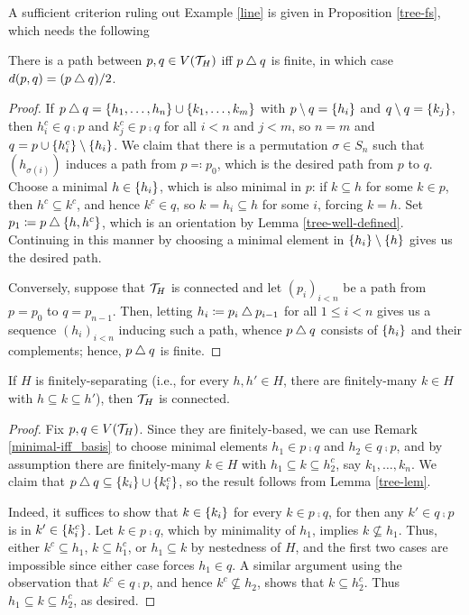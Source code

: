 \documentclass{amsart}
\begin{document}
    A sufficient criterion ruling out Example \ref{line} is given in Proposition \ref{tree-fs}, which needs the following

    \begin{lemma}\label{tree-lem}
        There is a path between $p,q\in V(\mathcal{T}_H)$ iff $p\bigtriangleup q$ is finite, in which case $d(p,q)=(p\bigtriangleup q)/2$.
    \end{lemma}
    \begin{proof}
        If $p\bigtriangleup q=\left\{h_1,\dots,h_n\right\}\cup\left\{k_1,\dots,k_m\right\}$ with $p\setminus q=\left\{h_i\right\}$ and $q\setminus q=\left\{k_j\right\}$, then $h_i^c\in q\comp p$ and $k_j^c\in p\comp q$ for all $i<n$ and $j<m$, so $n=m$ and $q=p\cup\left\{h_i^c\right\}\setminus\left\{h_i\right\}$. We claim that there is a permutation $\sigma\in S_n$ such that $(h_{\sigma(i)})$ induces a path from $p\eqqcolon p_0$, which is the desired path from $p$ to $q$. Choose a minimal $h\in\left\{h_i\right\}$, which is also minimal in $p$: if $k\subseteq h$ for some $k\in p$, then $h^c\subseteq k^c$, and hence $k^c\in q$, so $k=h_i\subseteq h$ for some $i$, forcing $k=h$. Set $p_1\coloneqq p\bigtriangleup\left\{h,h^c\right\}$, which is an orientation by Lemma \ref{tree-well-defined}. Continuing in this manner by choosing a minimal element in $\left\{h_i\right\}\setminus\left\{h\right\}$ gives us the desired path.

        Conversely, suppose that $\mathcal{T}_H$ is connected and let $(p_i)_{i<n}$ be a path from $p=p_0$ to $q=p_{n-1}$. Then, letting $h_i\coloneqq p_i\bigtriangleup p_{i-1}$ for all $1\leq i<n$ gives us a sequence $(h_i)_{i<n}$ inducing such a path, whence $p\bigtriangleup q$ consists of $\left\{h_i\right\}$ and their complements; hence, $p\bigtriangleup q$ is finite.
    \end{proof}

    \begin{proposition}\label{tree-fs}
        If $H$ is finitely-separating (i.e., for every $h,h'\in H$, there are finitely-many $k\in H$ with $h\subseteq k\subseteq h'$), then $\mathcal{T}_H$ is connected.
    \end{proposition}
    \begin{proof}
        Fix $p,q\in V(\mathcal{T}_H)$. Since they are finitely-based, we can use Remark \ref{minimal-iff_basis} to choose minimal elements $h_1\in p\comp q$ and $h_2\in q\comp p$, and by assumption there are finitely-many $k\in H$ with $h_1\subseteq k\subseteq h_2^c$, say $k_1,\dots,k_n$. We claim that $p\bigtriangleup q\subseteq\left\{k_i\right\}\cup\left\{k_i^c\right\}$, so the result follows from Lemma \ref{tree-lem}.

        Indeed, it suffices to show that $k\in\left\{k_i\right\}$ for every $k\in p\comp q$, for then any $k'\in q\comp p$ is in $k'\in\left\{k_i^c\right\}$. Let $k\in p\comp q$, which by minimality of $h_1$, implies $k\not\subseteq h_1$. Thus, either $k^c\subseteq h_1$, $k\subseteq h_1^c$, or $h_1\subseteq k$ by nestedness of $H$, and the first two cases are impossible since either case forces $h_1\in q$. A similar argument using the observation that $k^c\in q\comp p$, and hence $k^c\not\subseteq h_2$, shows that $k\subseteq h_2^c$. Thus $h_1\subseteq k\subseteq h_2^c$, as desired.
    \end{proof}
\end{document}
